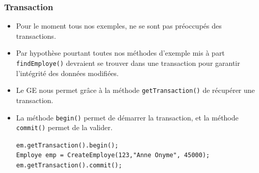 \documentclass[xcolor=pdftex,x11names,table]{beamer}
\begin{document}
	\begin{frame}
    \frametitle{Transaction}
    \begin{itemize}
      \item Pour le moment tous nos exemples, ne se sont pas préoccupés des transactions.
      \item Par hypothèse pourtant toutes nos méthodes d'exemple mis à part \texttt{findEmploye()} 
      devraient se trouver dans une transaction pour garantir l'intégrité des données modifiées.
      \item Le GE nous permet grâce à la méthode \texttt{getTransaction()} de récupérer une  transaction.
      \item La méthode \texttt{begin()} permet de démarrer la transaction, et la méthode \texttt{commit()} permet 
      de la valider.
      	\begin{block}{}
      		\lstinline$em.getTransaction().begin();$\\
					\lstinline$Employe emp = CreateEmploye(123,"Anne Onyme", 45000);$\\
      		\lstinline$em.getTransaction().commit();$\\
				\end{block}
    \end{itemize}
  \end{frame}
  
\end{document}

